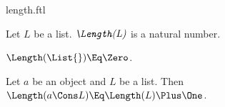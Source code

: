 \documentclass{stex}
\begin{document}
\begin{smodule}{length.ftl}



\begin{signature*}[forthel,for=Length]
  Let $L$ be a list.
  $\emph{\Length(L)}$ is a natural number.
\end{signature*}

\begin{axiom*}[forthel,for=Length]
  $\Length(\List{}) \Eq \Zero$.
\end{axiom*}

\begin{axiom*}[forthel,for=Length]
  Let $a$ be an object and $L$ be a list.
  Then $\Length(a \Cons L) \Eq \Length(L) \Plus \One$.
\end{axiom*}

\end{smodule}
\end{document}
